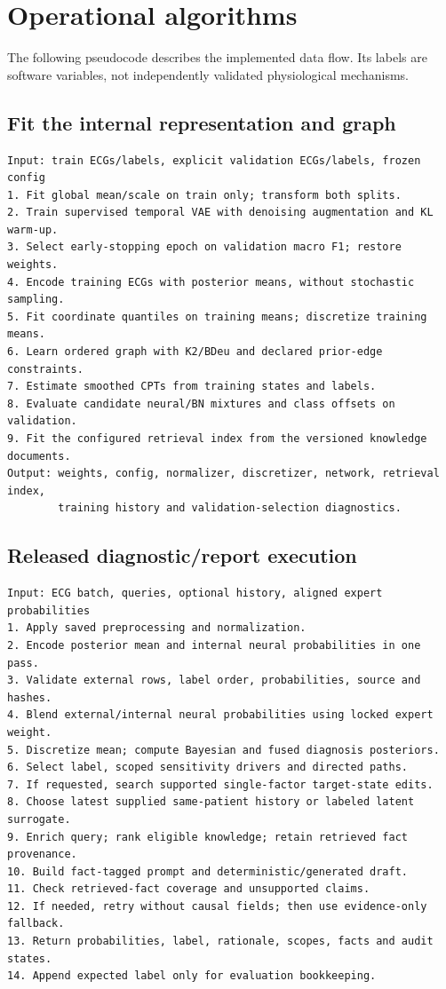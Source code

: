 \section{Operational algorithms}
\label{app:algorithms}
The following pseudocode describes the implemented data flow. Its labels are software variables, not independently validated physiological mechanisms.

\subsection{Fit the internal representation and graph}
\begin{lstlisting}
Input: train ECGs/labels, explicit validation ECGs/labels, frozen config
1. Fit global mean/scale on train only; transform both splits.
2. Train supervised temporal VAE with denoising augmentation and KL warm-up.
3. Select early-stopping epoch on validation macro F1; restore weights.
4. Encode training ECGs with posterior means, without stochastic sampling.
5. Fit coordinate quantiles on training means; discretize training means.
6. Learn ordered graph with K2/BDeu and declared prior-edge constraints.
7. Estimate smoothed CPTs from training states and labels.
8. Evaluate candidate neural/BN mixtures and class offsets on validation.
9. Fit the configured retrieval index from the versioned knowledge documents.
Output: weights, config, normalizer, discretizer, network, retrieval index,
        training history and validation-selection diagnostics.
\end{lstlisting}

\subsection{Released diagnostic/report execution}
\begin{lstlisting}
Input: ECG batch, queries, optional history, aligned expert probabilities
1. Apply saved preprocessing and normalization.
2. Encode posterior mean and internal neural probabilities in one pass.
3. Validate external rows, label order, probabilities, source and hashes.
4. Blend external/internal neural probabilities using locked expert weight.
5. Discretize mean; compute Bayesian and fused diagnosis posteriors.
6. Select label, scoped sensitivity drivers and directed paths.
7. If requested, search supported single-factor target-state edits.
8. Choose latest supplied same-patient history or labeled latent surrogate.
9. Enrich query; rank eligible knowledge; retain retrieved fact provenance.
10. Build fact-tagged prompt and deterministic/generated draft.
11. Check retrieved-fact coverage and unsupported claims.
12. If needed, retry without causal fields; then use evidence-only fallback.
13. Return probabilities, label, rationale, scopes, facts and audit states.
14. Append expected label only for evaluation bookkeeping.
\end{lstlisting}

